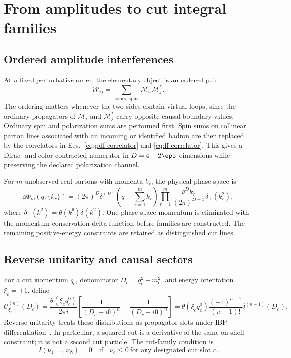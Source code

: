 \section{From amplitudes to cut integral families}
\label{sec:cut-families}

\subsection{Ordered amplitude interferences}

At a fixed perturbative order, the elementary object is an ordered pair
\begin{equation}
 \mathcal W_{ij}
 =\sum_{\text{colors, spins}}
 \mathcal M_i\,\mathcal M_j^*.
 \label{eq:ordered-interference}
\end{equation}
The ordering matters whenever the two sides contain virtual loops, since the
ordinary propagators of $\mathcal M_i$ and $\mathcal M_j^*$ carry opposite
causal boundary values.  Ordinary spin and polarization sums are performed
first.  Spin sums on collinear parton lines associated with an incoming or
identified hadron are then replaced by the correlators in
Eqs.~\eqref{eq:pdf-correlator} and \eqref{eq:ff-correlator}.  This gives a
Dirac- and color-contracted numerator in $D=4-2\eps$ dimensions while
preserving the declared polarization channel.

For $m$ unobserved real partons with momenta $k_r$, the physical phase
space is
\begin{equation}
 \dd\Phi_m(q;\{k_r\})
 =(2\pi)^D\delta^{(D)}\!\left(q-\sum_{r=1}^m k_r\right)
 \prod_{r=1}^m
 \frac{\dd^Dk_r}{(2\pi)^{D-1}}\delta_+(k_r^2),
 \label{eq:physical-m-particle-phase-space}
\end{equation}
where $\delta_+(k^2)=\theta(k^0)\delta(k^2)$.  One phase-space momentum is
eliminated with the momentum-conservation delta function before families are
constructed.  The remaining positive-energy constraints are retained as
distinguished cut lines.

\subsection{Reverse unitarity and causal sectors}

For a cut momentum $q_c$, denominator $D_c=q_c^2-m_c^2$, and energy
orientation $\xi_c=\pm1$, define
\begin{equation}
 \mathcal C_{\xi_c}^{(n)}(D_c)
 =\frac{\theta(\xi_cq_c^0)}{2\pi i}
 \left[\frac{1}{(D_c-i0)^n}-\frac{1}{(D_c+i0)^n}\right]
 =\theta(\xi_cq_c^0)
 \frac{(-1)^{n-1}}{(n-1)!}\delta^{(n-1)}(D_c).
 \label{eq:oriented-cut}
\end{equation}
Reverse unitarity treats these distributions as propagator slots under IBP
differentiation~\cite{Anastasiou:2002yz}.  In particular, a squared cut is a
derivative of the same on-shell constraint; it is not a second cut particle.
The cut-family condition is
\begin{equation}
 I(\nu_1,\ldots,\nu_N)=0
 \quad\text{if}\quad
 \nu_c\leq0\ \text{for any designated cut slot }c.
 \label{eq:cut-family-condition}
\end{equation}

